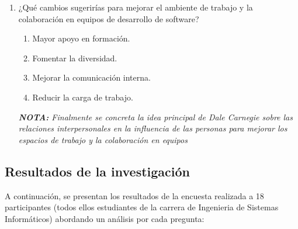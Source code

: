 \documentclass[journal]{IEEEtran}
\begin{document}
\begin{enumerate}
	\item ¿Qué cambios sugerirías para mejorar el ambiente de trabajo y la colaboración en equipos de desarrollo de software?
	\begin{enumerate}
		\item Mayor apoyo en formación.
		\item Fomentar la diversidad.
		\item Mejorar la comunicación interna.
		\item Reducir la carga de trabajo.
	\end{enumerate}
	\textit{\textbf{NOTA:} Finalmente se concreta la idea principal de Dale Carnegie sobre las relaciones interpersonales en la influencia de las personas para mejorar los espacios de trabajo y la colaboración en equipos}
\end{enumerate}

\subsection{Resultados de la investigación}
A continuación, se presentan los resultados de la encuesta realizada a 18 participantes (todos ellos estudiantes de la carrera de Ingenieria de Sistemas Informáticos) abordando un análisis por cada pregunta:
\end{document}
